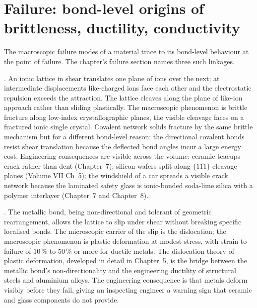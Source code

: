 \section{Failure: bond-level origins of brittleness, ductility, conductivity}

The macroscopic failure modes of a material trace to its bond-level
behaviour at the point of failure. The chapter's failure section names
three such linkages.

. An ionic
lattice in shear translates one plane of ions over the next; at
intermediate displacements like-charged ions face each other and the
electrostatic repulsion exceeds the attraction. The lattice cleaves
along the plane of like-ion approach rather than sliding plastically.
The macroscopic phenomenon is brittle fracture along low-index
crystallographic planes, the visible cleavage faces on a fractured
ionic single crystal. Covalent network solids fracture by the same
brittle mechanism but for a different bond-level reason: the
directional covalent bonds resist shear translation because the
deflected bond angles incur a large energy cost. Engineering
consequences are visible across the volume: ceramic teacups crack
rather than dent (Chapter~7); silicon wafers split along $\{111\}$
cleavage planes (Volume VII Ch~5); the windshield of a car spreads a
visible crack network because the laminated safety glass is
ionic-bonded soda-lime silica with a polymer interlayer (Chapter~7
and Chapter~8).

. The metallic bond, being non-directional
and tolerant of geometric rearrangement, allows the lattice to slip
under shear without breaking specific localised bonds. The
microscopic carrier of the slip is the dislocation; the macroscopic
phenomenon is plastic deformation at modest stress, with strain to
failure of $10\,\%$ to $50\,\%$ or more for ductile metals. The
dislocation theory of plastic deformation, developed in detail in
Chapter~5, is the bridge between the metallic bond's non-directionality
and the engineering ductility of structural steels and aluminium
alloys. The engineering consequence is that metals deform visibly
before they fail, giving an inspecting engineer a warning sign that
ceramic and glass components do not provide.

